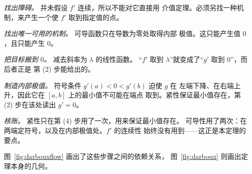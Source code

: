 \begin{flow}[证明的脉络]
  \item \textit{找出障碍。} 并未假设 $f'$ 连续，所以不能对它直接用
        介值定理。必须另找一种机制，来产生一个使 $f'$ 取到指定值的点。
  \item \textit{找出唯一可用的机制。} 可导函数只在导数为零处取得内部
        极值。这只能产生值 $0$，且只能产生 $0$。
  \item \textit{把目标搬到 $0$。} 减去斜率为 $\lambda$ 的线性函数。
        “$f'$ 取到 $\lambda$”就变成了“$g'$ 取到 $0$”，而后者正是
        第 (2) 步能给出的。
  \item \textit{制造内部极值。} 符号条件 $g'(a)<0<g'(b)$ 迫使 $g$ 在
        左端下降、在右端上升，因此它在 $[a,b]$ 上的最小值不可能在端点
        取到。紧性保证最小值存在，第 (2) 步在该处读出 $g'=0$。
  \item \textit{核账。} 紧性只在第 (4) 步用了一次，用来保证最小值存在。
        可导性用了两次：在两端定符号，以及在内部极值处。$f'$ 的连续性
        始终没有用到——这正是本定理的要点。
\end{flow}

图~\ref{fig:darbouxflow} 画出了这些步骤之间的依赖关系，
图~\ref{fig:darboux} 则画出定理本身的几何。


